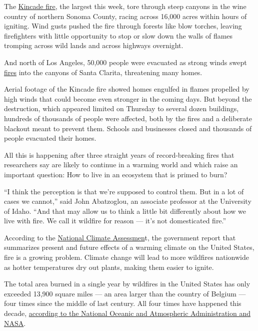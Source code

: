 The
\href{https://www.nytimes.com/2019/10/24/us/california-fires-today.html}{Kincade
fire}, the largest this week, tore through steep canyons in the wine
country of northern Sonoma County, racing across 16,000 acres within
hours of igniting. Wind gusts pushed the fire through forests like blow
torches, leaving firefighters with little opportunity to stop or slow
down the walls of flames tromping across wild lands and across highways
overnight.

And north of Los Angeles, 50,000 people were evacuated as strong winds
swept
\href{https://www.nytimes.com/2019/10/24/us/california-fires-today.html}{fires}
into the canyons of Santa Clarita, threatening many homes.

Aerial footage of the Kincade fire showed homes engulfed in flames
propelled by high winds that could become even stronger in the coming
days. But beyond the destruction, which appeared limited on Thursday to
several dozen buildings, hundreds of thousands of people were affected,
both by the fires and a deliberate blackout meant to prevent them.
Schools and businesses closed and thousands of people evacuated their
homes.

All this is happening after three straight years of record-breaking
fires that researchers say are likely to continue in a warming world and
which raise an important question: How to live in an ecosystem that is
primed to burn?

``I think the perception is that we're supposed to control them. But in
a lot of cases we cannot,'' said John Abatzoglou, an associate professor
at the University of Idaho. ``And that may allow us to think a little
bit differently about how we live with fire. We call it wildfire for
reason --- it's not domesticated fire.''

According to the
\href{https://www.nytimes.com/2018/11/23/climate/us-climate-report.html?module=inline}{National
Climate Assessmen}t, the government report that summarizes present and
future effects of a warming climate on the United States, fire is a
growing problem. Climate change will lead to more wildfires nationwide
as hotter temperatures dry out plants, making them easier to ignite.

The total area burned in a single year by wildfires in the United States
has only exceeded 13,900 square miles --- an area larger than the
country of Belgium --- four times since the middle of last century. All
four times have happened this decade,
\href{https://www.esrl.noaa.gov/csd/projects/firex-aq/whitepaper.pdf}{according
to the National Oceanic and Atmospheric Administration and NASA}.

